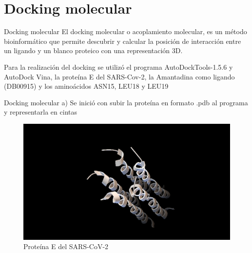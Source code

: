 \documentclass[11pt]{beamer}
\begin{document}
	
	\section{Docking molecular}
		\begin{frame}{Docking molecular}
			\justifying El docking molecular o acoplamiento molecular, es un método bioinformático que permite descubrir y calcular la posición de interacción entre un ligando y un blanco proteico con una representación 3D.
			
			Para la realización del docking se utilizó el programa AutoDockTools-1.5.6 y AutoDock Vina, la proteína E del SARS-Cov-2, la Amantadina como ligando (DB00915) y los aminoácidos ASN15, LEU18 y LEU19
		\end{frame}
	
	\begin{frame}{Docking molecular}
			\justifying 
			a) Se inició con subir la proteína en formato .pdb al programa y representarla en cintas
			
			\begin{figure}[H]
				\centering
				\includegraphics[scale=0.5]{Ecintas.png}
				\caption{Proteína E del SARS-CoV-2}
				\label{fig: Figura1}
			\end{figure}
		\end{frame} 
		
\end{document}
